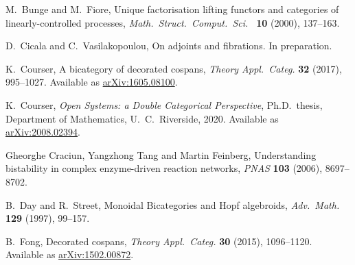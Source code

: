 \documentclass[reqno]{amsart}
\begin{document}
\begin{thebibliography}{100}



 M.\ Bunge and M.\ Fiore, Unique factorisation lifting functors and categories of linearly-controlled processes, \textsl{Math.\ Struct.\ Comput.\ Sci.\ } \textbf{10} (2000), 137--163.


 D.\ Cicala and C.\ Vasilakopoulou, On adjoints and fibrations. In preparation.

 K.\ Courser, A bicategory of decorated cospans, \textsl{Theory Appl.\ Categ.} \textbf{32} (2017), 995--1027. Available as \href{https://arxiv.org/abs/1605.08100}{arXiv:1605.08100}.

 K.\ Courser, \textsl{Open Systems: a Double Categorical Perspective}, Ph.D.\ thesis, Department of Mathematics, U.\ C.\ Riverside, 2020.  Available as \href{https://arxiv.org/abs/2008.02394}{arXiv:2008.02394}.

 Gheorghe Craciun, Yangzhong Tang and Martin Feinberg, Understanding bistability in complex enzyme-driven reaction networks, \textsl{PNAS} \textbf{103} (2006), 8697--8702.  

 B.\ Day and R.\ Street, Monoidal Bicategories and Hopf algebroids, \textsl{Adv.\ Math.} \textbf{129} (1997), 99--157.



 B.\ Fong, Decorated cospans, \emph{Theory Appl.\ Categ.} \textbf{30} (2015), 1096--1120.  Available as \href{http://arxiv.org/abs/1502.00872}{arXiv:1502.00872}.


\end{thebibliography}
\end{document}
